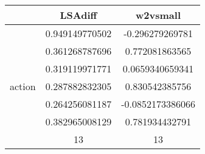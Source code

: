 \documentclass{article}
\begin{document}
\begin{tabular}{ccc|}\cline{2-3}
&\multicolumn{1}{|c}{LSAdiff} & w2vsmall \\\hline
\multicolumn{1}{|c|}{\multirow{7}{*}{action}} & 0.949149770502 & -0.296279269781 \\
\multicolumn{1}{|c|}{} & 0.361268787696 & 0.772081863565 \\
\multicolumn{1}{|c|}{} & 0.319119971771 & 0.0659340659341 \\
\multicolumn{1}{|c|}{} & 0.287882832305 & 0.830542385756 \\
\multicolumn{1}{|c|}{} & 0.264256081187 & -0.0852173386066 \\
\multicolumn{1}{|c|}{} & 0.382965008129 & 0.781934432791 \\
\multicolumn{1}{|c|}{} & 13 & 13 \\
\hline
\end{tabular}\\
\end{document}
